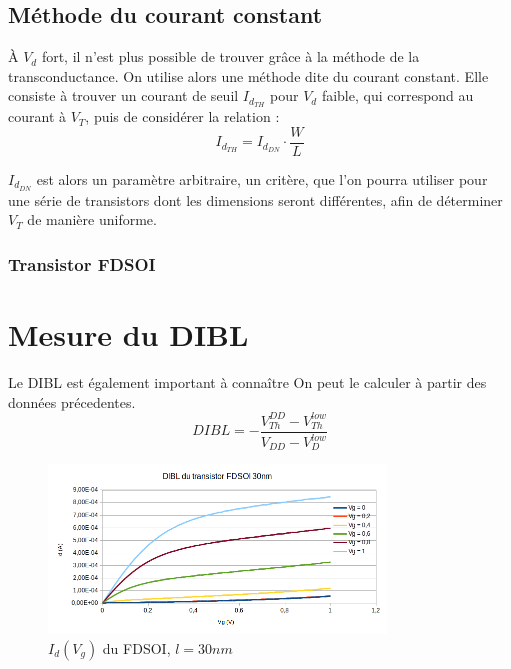 \documentclass[a4paper,11pt]{report}
\begin{document}
\section{Méthode du courant constant}
À $V_d$ fort, il n'est plus possible de trouver grâce à la méthode de la transconductance. On utilise alors une méthode dite du courant constant. Elle consiste à trouver un courant de seuil $I_{d_{TH}}$ pour $V_d$ faible, qui correspond au courant à $V_T$, puis de considérer la relation : \[I_{d_{TH}}=I_{d_{DN}}\cdot\dfrac{W}{L}\]

$I_{d_{DN}}$ est alors un paramètre arbitraire, un critère, que l'on pourra utiliser pour une série de transistors dont les dimensions seront différentes, afin de déterminer $V_T$ de manière uniforme.


\subsection{Transistor FDSOI}


\chapter{Mesure du DIBL}
Le DIBL est également important à connaître %
On peut le calculer à partir des données précedentes.
\[ DIBL = -\frac{V^{DD}_{Th} - V^{low}_{Th}}{V_{DD} - V^{low}_{D}}
\]


\begin{figure}[h]
    \begin{center}
        \includegraphics[width=0.8\textwidth]{Images/DIBL-11-30}
        \caption{$I_d(V_g)$ du FDSOI, $l = 30nm$}
        \label{transc_fdsoi_30nm}
    \end{center}
\end{figure}
\end{document}
